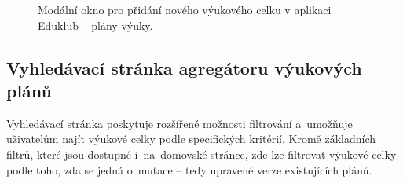 \documentclass[male,czech,api_bc]{kitheses}
\begin{document}
\begin{figure}[H]
	\centering
	\caption{Modální okno pro přidání nového výukového celku v aplikaci Eduklub – plány výuky.}
	\label{fig:eduklub-2}
\end{figure}

\subsection{Vyhledávací stránka agregátoru výukových plánů}

Vyhledávací stránka poskytuje rozšířené možnosti filtrování a~umožňuje uživatelům najít výukové celky podle specifických kritérií. Kromě základních filtrů, které jsou dostupné i~na~domovské stránce, zde lze filtrovat výukové celky podle toho, zda se jedná o~mutace – tedy upravené verze existujících plánů.
\end{document}
